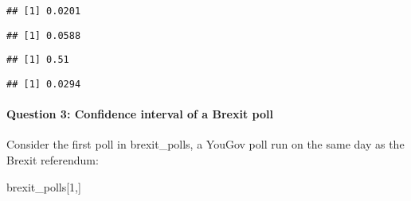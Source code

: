 \documentclass[
]{article}
\newenvironment{Shaded}{\begin{snugshade}}{\end{snugshade}}
\newcommand{\CommentTok}[1]{\textcolor[rgb]{0.56,0.35,0.01}{\textit{#1}}}
\newcommand{\DecValTok}[1]{\textcolor[rgb]{0.00,0.00,0.81}{#1}}
\newcommand{\KeywordTok}[1]{\textcolor[rgb]{0.13,0.29,0.53}{\textbf{#1}}}
\newcommand{\NormalTok}[1]{#1}
\newcommand{\OperatorTok}[1]{\textcolor[rgb]{0.81,0.36,0.00}{\textbf{#1}}}
\begin{document}
\begin{verbatim}
## [1] 0.0201
\end{verbatim}

\begin{Shaded}
\end{Shaded}

\begin{verbatim}
## [1] 0.0588
\end{verbatim}

\begin{Shaded}
\end{Shaded}

\begin{verbatim}
## [1] 0.51
\end{verbatim}

\begin{Shaded}
\end{Shaded}

\begin{verbatim}
## [1] 0.0294
\end{verbatim}

\hypertarget{question-3-confidence-interval-of-a-brexit-poll}{%
\paragraph{Question 3: Confidence interval of a Brexit
poll}\label{question-3-confidence-interval-of-a-brexit-poll}}

Consider the first poll in brexit\_polls, a YouGov poll run on the same
day as the Brexit referendum:

\begin{Shaded}
\begin{Highlighting}[]
\NormalTok{brexit\_polls[}\DecValTok{1}\NormalTok{,]}
\end{Highlighting}
\end{Shaded}
\end{document}

